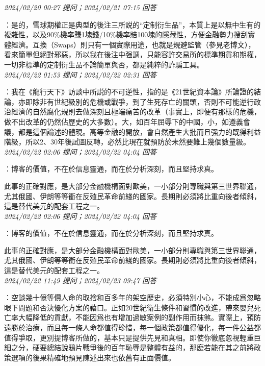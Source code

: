 \documentclass[twocolumn]{ctexart}
\begin{document}
\textit{\hfill\noindent\small 2024/02/20 00:27 提问；2024/02/21 07:15 回答}

：是的，雪球期權正是典型的後注三所説的“定制衍生品”，本質上是以無中生有的複雜性，以及90\%機率賺1塊錢/10\%機率賠100塊的隱藏性，方便金融勢力搜刮實體經濟。互換（Swaps）則只有一個實際用途，也就是規避監管（參見老博文），看來簡單但絕對邪惡，所以我在後注中强調，只能容許交易所的標準期貨和期權，一切非標準的定制衍生品不論簡單與否，都是純粹的詐騙工具。
\\

\textit{\hfill\noindent\small 2024/02/22 01:53 提问；2024/02/22 02:31 回答}

：我在《龍行天下》訪談中所説的不可逆性，指的是《21世紀資本論》所論證的結論，亦即除非有世紀級別的危機或戰爭，到了生死存亡的關頭，否則不可能逆行政治經濟的自然腐化規則去做深刻且極端痛苦的改革（事實上，即便有那樣的危機，做不出改革的仍然佔歷史的大多數）。大，如百年屈辱下的中國，小，如遵義會議，都是這個論述的體現。高等金融的開放，會自然產生大批而且强力的既得利益階級，所以2、30年後試圖反轉，必然比現在就預防於未然要難上幾個數量級。
\\

\textit{\hfill\noindent\small 2024/02/22 02:06 提问；2024/02/22 04:04 回答}

：博客的價值，不在於信息靈通，而在於分析深刻，而且堅持求真。

此事的正確對應，是大部分金融機構面對歐美，一小部分則專職與第三世界聯通，尤其俄國、伊朗等等衝在反殖民革命前綫的國家。長期則必須將比重向後者傾斜，這是替代美元的配套工程之一。
\\

\textit{\hfill\noindent\small 2024/02/22 02:06 提问；2024/02/22 04:04 回答}

：博客的價值，不在於信息靈通，而在於分析深刻，而且堅持求真。

此事的正確對應，是大部分金融機構面對歐美，一小部分則專職與第三世界聯通，尤其俄國、伊朗等等衝在反殖民革命前綫的國家。長期則必須將比重向後者傾斜，這是替代美元的配套工程之一。
\\

\textit{\hfill\noindent\small 2024/02/22 11:49 提问；2024/02/23 09:47 回答}

：空談幾十億等價人命的取捨和百多年的架空歷史，必須特別小心，不能成爲忽略眼下問題和否決優化方案的藉口。正如20世紀衛生條件和習慣的改進，帶來嬰兒死亡率大幅降低的貢獻，不能因爲也有增加過敏案例的副作用而抹煞。實際上，預防遠勝於治療，而且每一條人命都值得珍惜，每一個政策都值得優化，每一件公益都值得爭取，更別提博客所做的，基本只是提供先見和真相。即使你徹底忽視輕重巨細之分，硬要總結說鴉片戰爭後的百年恥辱是整體有益的，那麽若能在其之前將政策選項的後果精確地預見陳述出來也依舊有正面價值。
\end{document}
